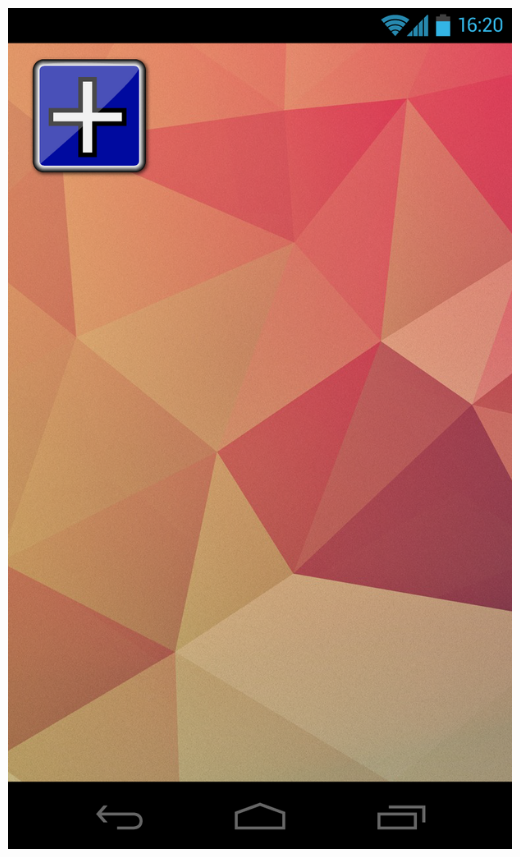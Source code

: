 \documentclass[pdftex,12pt,a4paper]{report}
\begin{document}
\includegraphics[scale=0.18]{Screens/00-Launch.png}
\end{document}
